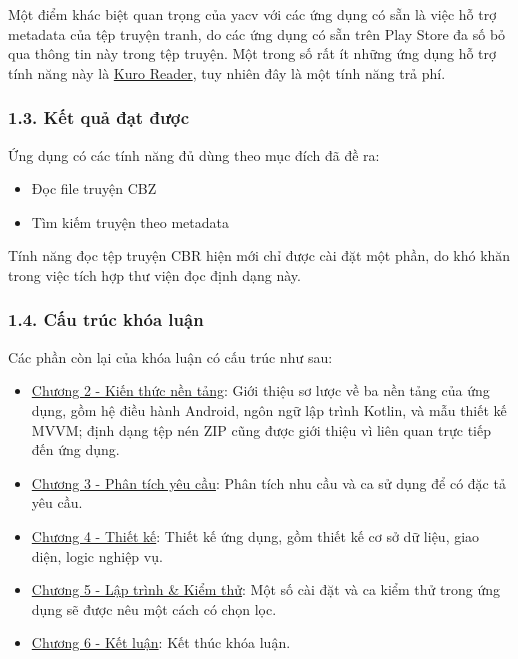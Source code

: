 \documentclass[
]{article}
\providecommand{\tightlist}{%
  \setlength{\itemsep}{0pt}\setlength{\parskip}{0pt}}
\begin{document}
Một điểm khác biệt quan trọng của yacv với các ứng dụng có sẵn là việc
hỗ trợ metadata của tệp truyện tranh, do các ứng dụng có sẵn trên Play
Store đa số bỏ qua thông tin này trong tệp truyện. Một trong số rất ít
những ứng dụng hỗ trợ tính năng này là
\href{https://play.google.com/store/apps/details?id=br.com.kurotoshiro.leitor_manga\&hl=en\&gl=US}{Kuro
Reader}, tuy nhiên đây là một tính năng trả phí.

\hypertarget{kux1ebft-quux1ea3-ux111ux1ea1t-ux111ux1b0ux1ee3c}{%
\subsubsection{\texorpdfstring{1.3. Kết quả đạt được
}{1.3. Kết quả đạt được }}\label{kux1ebft-quux1ea3-ux111ux1ea1t-ux111ux1b0ux1ee3c}}

Ứng dụng có các tính năng đủ dùng theo mục đích đã đề ra:

\begin{itemize}
\tightlist
\item
  Đọc file truyện CBZ
\item
  Tìm kiếm truyện theo metadata
\end{itemize}

Tính năng đọc tệp truyện CBR hiện mới chỉ được cài đặt một phần, do khó
khăn trong việc tích hợp thư viện đọc định dạng này.

\hypertarget{cux1ea5u-truxfac-khuxf3a-luux1eadn}{%
\subsubsection{\texorpdfstring{1.4. Cấu trúc khóa luận
}{1.4. Cấu trúc khóa luận }}\label{cux1ea5u-truxfac-khuxf3a-luux1eadn}}

Các phần còn lại của khóa luận có cấu trúc như sau:

\begin{itemize}
\tightlist
\item
  \protect\hyperlink{P2-fundamental}{Chương 2 - Kiến thức nền tảng}:
  Giới thiệu sơ lược về ba nền tảng của ứng dụng, gồm hệ điều hành
  Android, ngôn ngữ lập trình Kotlin, và mẫu thiết kế MVVM; định dạng
  tệp nén ZIP cũng được giới thiệu vì liên quan trực tiếp đến ứng dụng.
\item
  \protect\hyperlink{P3-requirements}{Chương 3 - Phân tích yêu cầu}:
  Phân tích nhu cầu và ca sử dụng để có đặc tả yêu cầu.
\item
  \protect\hyperlink{P4-design}{Chương 4 - Thiết kế}: Thiết kế ứng dụng,
  gồm thiết kế cơ sở dữ liệu, giao diện, logic nghiệp vụ.
\item
  \protect\hyperlink{P5-implementation}{Chương 5 - Lập trình \& Kiểm
  thử}: Một số cài đặt và ca kiểm thử trong ứng dụng sẽ được nêu một
  cách có chọn lọc.
\item
  \protect\hyperlink{P6-comclusion}{Chương 6 - Kết luận}: Kết thúc khóa
  luận.
\end{itemize}
\end{document}

